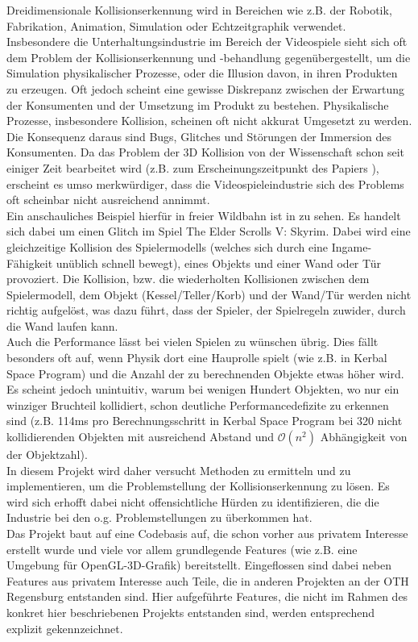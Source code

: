 
Dreidimensionale Kollisionserkennung wird in Bereichen wie z.B. der Robotik, Fabrikation, Animation, Simulation oder Echtzeitgraphik verwendet.
Insbesondere die Unterhaltungsindustrie im Bereich der Videospiele sieht sich oft dem Problem der Kollisionserkennung und -behandlung gegenübergestellt, um die Simulation physikalischer Prozesse, oder die Illusion davon, in ihren Produkten zu erzeugen.
Oft jedoch scheint eine gewisse Diskrepanz zwischen der Erwartung der Konsumenten und der Umsetzung im Produkt zu bestehen. Physikalische Prozesse, insbesondere Kollision, scheinen oft nicht akkurat Umgesetzt zu werden. Die Konsequenz daraus sind Bugs, Glitches und Störungen der Immersion des Konsumenten.
Da das Problem der 3D Kollision von der Wissenschaft schon seit einiger Zeit bearbeitet wird (z.B. zum Erscheinungszeitpunkt des Papiers \cite{gjk}), erscheint es umso merkwürdiger, dass die Videospieleindustrie sich des Problems oft scheinbar nicht ausreichend annimmt.\\
Ein anschauliches Beispiel hierfür in freier Wildbahn ist in \cite{skyrimwallglitch} zu sehen. Es handelt sich dabei um einen Glitch im Spiel The Elder Scrolls V: Skyrim. Dabei wird eine gleichzeitige Kollision des Spielermodells (welches sich durch eine Ingame-Fähigkeit unüblich schnell bewegt), eines Objekts und einer Wand oder Tür provoziert. Die Kollision, bzw. die wiederholten Kollisionen zwischen dem Spielermodell, dem Objekt (Kessel/Teller/Korb) und der Wand/Tür werden nicht richtig aufgelöst, was dazu führt, dass der Spieler, der Spielregeln zuwider, durch die Wand laufen kann.\\
Auch die Performance lässt bei vielen Spielen zu wünschen übrig. Dies fällt besonders oft auf, wenn Physik dort eine Hauprolle spielt (wie z.B. in Kerbal Space Program) und die Anzahl der zu berechnenden Objekte etwas höher wird. Es scheint jedoch unintuitiv, warum bei wenigen Hundert Objekten, wo nur ein winziger Bruchteil kollidiert, schon deutliche Performancedefizite zu erkennen sind (z.B. 114ms pro Berechnungsschritt in Kerbal Space Program bei 320 nicht kollidierenden Objekten mit ausreichend Abstand und $\mathcal{O}(n^2)$ Abhängigkeit von der Objektzahl).\\
In diesem Projekt wird daher versucht Methoden zu ermitteln und zu implementieren, um die Problemstellung der Kollisionserkennung zu lösen. Es wird sich erhofft dabei nicht offensichtliche Hürden zu identifizieren, die die Industrie bei den o.g. Problemstellungen zu überkommen hat. \\
Das Projekt baut auf eine Codebasis auf, die schon vorher aus privatem Interesse erstellt wurde und viele vor allem grundlegende Features (wie z.B. eine Umgebung für OpenGL-3D-Grafik) bereitstellt. Eingeflossen sind dabei neben Features aus privatem Interesse auch Teile, die in anderen Projekten an der OTH Regensburg entstanden sind. Hier aufgeführte Features, die nicht im Rahmen des konkret hier beschriebenen Projekts entstanden sind, werden entsprechend explizit gekennzeichnet.
